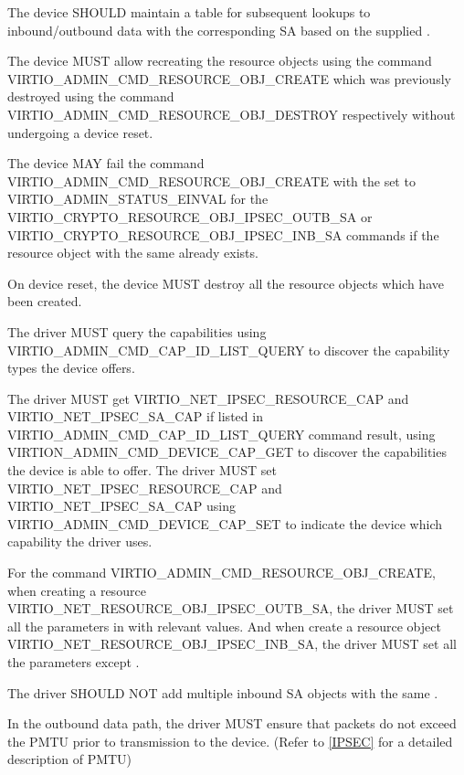 The device SHOULD maintain a table for subsequent lookups to inbound/outbound data
with the corresponding SA based on the supplied .

The device MUST allow recreating the resource objects using the command
VIRTIO_ADMIN_CMD_RESOURCE_OBJ_CREATE which was previously destroyed using
the command VIRTIO_ADMIN_CMD_RESOURCE_OBJ_DESTROY respectively without
undergoing a device reset.

The device MAY fail the command VIRTIO_ADMIN_CMD_RESOURCE_OBJ_CREATE with
the  set to VIRTIO_ADMIN_STATUS_EINVAL for the
VIRTIO_CRYPTO_RESOURCE_OBJ_IPSEC_OUTB_SA or VIRTIO_CRYPTO_RESOURCE_OBJ_IPSEC_INB_SA
commands if the resource object with the same  already exists.

On device reset, the device MUST destroy all the resource objects which have been created.


The driver MUST query the capabilities using VIRTIO_ADMIN_CMD_CAP_ID_LIST_QUERY
to discover the capability types the device offers.

The driver MUST get VIRTIO_NET_IPSEC_RESOURCE_CAP and VIRTIO_NET_IPSEC_SA_CAP
if listed in VIRTIO_ADMIN_CMD_CAP_ID_LIST_QUERY command result, using
VIRTION_ADMIN_CMD_DEVICE_CAP_GET to discover the capabilities the device is
able to offer.
The driver MUST set VIRTIO_NET_IPSEC_RESOURCE_CAP and VIRTIO_NET_IPSEC_SA_CAP
using VIRTIO_ADMIN_CMD_DEVICE_CAP_SET to indicate the device which capability
the driver uses.

For the command VIRTIO_ADMIN_CMD_RESOURCE_OBJ_CREATE, when creating a resource
VIRTIO_NET_RESOURCE_OBJ_IPSEC_OUTB_SA, the driver MUST set all the parameters
in  with relevant values.
And when create a resource object VIRTIO_NET_RESOURCE_OBJ_IPSEC_INB_SA,
the driver MUST set all the parameters except
.

The driver SHOULD NOT add multiple inbound SA objects with the same .

In the outbound data path, the driver MUST ensure that packets do
not exceed the PMTU prior to transmission to the device.
(Refer to \hyperref[intro:IPSEC]{[IPSEC]} for a detailed description of PMTU)

